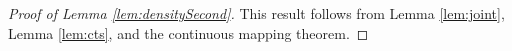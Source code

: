 \begin{proof}[Proof of Lemma \ref{lem:densitySecond}]
This result follows from Lemma \ref{lem:joint}, Lemma \ref{lem:cts}, and the continuous mapping theorem.
\end{proof}




